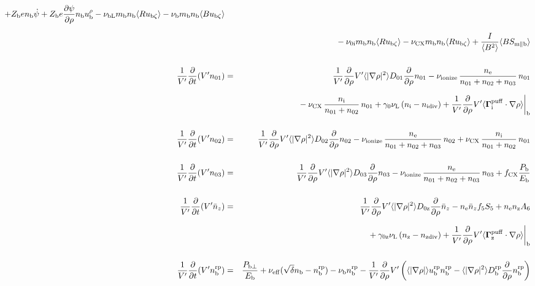 \documentclass[11pt]{article}
\def\bvec#1{\leavevmode\hbox{\boldmath$#1$}}
\let\vec=\bvec
\def\r#1{{\rm#1}}
\def\aves#1{\langle#1\rangle}
\def\dd#1#2{\frac{\partial #1}{\partial #2}}
\def\para{\parallel}
\def\ddrho{\frac{\partial}{\partial\rho}}
\def\ddV{\frac{\partial}{\partial V}}
\def\ddt{\frac{\partial}{\partial t}}
\def\mi{m_\r{i}}
\def\mb{m_\r{b}}
\def\nee{n_\r{e}}
\def\ni{n_\r{i}}
\def\nz{n_\r{z}}
\def\nb{n_\r{b}}
\def\Te{T_\r{e}}
\def\Zi{Z_\r{i}}
\def\Zb{Z_\r{b}}
\def\uzt#1{u_{\r{#1}\zeta}}
\def\upara#1{u_{\r{#1}\para}}
\def\qhatpara#1{\hat{q}_{\r{#1}\para}}
\def\urho#1{u_\r{#1}^\rho}
\def\De{D_\r{e}}
\def\nun#1{\nu_\r{0#1}}
\def\ndiv#1{n_\r{#1div}}
\def\nbrp{n_\r{b}^\r{rp}}
\def\ubrp{u_\r{b}^\r{rp}}
\def\Dbrp{D_\r{b}^\r{rp}}
\def\bri{\aves{B^2}\aves{R^2} - I^2}
\def\Pbperp{P_{\r{b}\perp}}
\def\Pb{P_\r{b}}
\def\Eb{E_\r{b}}
\def\nna{n_{01}}
\def\nnb{n_{02}}
\def\nnc{n_{03}}
\def\nnz{\bar{n}_{z}}
\def\nueff{\nu_\r{eff}}
\def\fCX{f_\r{CX}}
\def\nuL{\nu_\r{L}}
\def\nuCX{\nu_\r{CX}}
\def\nuion{\nu_\r{ionize}}
\def\nub{\nu_\r{b}}
\def\nuOL{\nu_\r{OL}}
\def\nubL{\nu_\r{bL}}
\def\red#1{\textcolor{red}{#1}}
\begin{document}
\begin{eqnarray}
%
  + \Zb e              \nb \dot{\psi}
%
  + \Zb e \dd{\psi}{\rho} \nb \urho{b}
%
%
  - \nubL \mb \nb \aves{R \uzt{b}}
%
  - \nub  \mb \nb \aves{B \uzt{b}}
\nonumber\\[2.5mm]&&{}
%
  - \nun{i} \mb \nb \aves{R \uzt{b}}
%
  - \nuCX \mb \nb \aves{R \uzt{b}}
%
%
  + \frac{I}{\aves{B^2}} \aves{B S_{\r{m}\para\r{b}}}
%
\\[5mm]
  \frac{1}{V'} \ddt (V' \nna) &=& 
%
    \frac{1}{V'} \ddrho V' \aves{|\nabla\rho|^2} D_{01} \ddrho \nna
%
  - \nuion\, \frac{\nee}{\nna + \nnb + \nnc}\, \nna
%
\nonumber\\[2.5mm]&&{}
  - \nuCX\, \frac{\ni}{\nna + \nnb}\, \nna
%
  + \gamma_0 \nuL \, (\ni - \ndiv{i})
%
  + \frac{1}{V'} \ddrho V' \aves{\vec{\Gamma}^\r{puff}_\r{i}\cdot\nabla\rho}\biggr|_\r{b}
\\[5mm]
  \frac{1}{V'} \ddt (V' \nnb) &=& 
%
    \frac{1}{V'} \ddrho V' \aves{|\nabla\rho|^2} D_{02} \ddrho \nnb
%
  - \nuion\, \frac{\nee}{\nna + \nnb + \nnc}\, \nnb
%
  + \nuCX\, \frac{\ni}{\nna + \nnb}\, \nna
%
\\[5mm]
  \frac{1}{V'} \ddt (V' \nnc) &=& 
%
    \frac{1}{V'} \ddrho V' \aves{|\nabla\rho|^2} D_{03} \ddrho \nnc
%
  - \nuion\, \frac{\nee}{\nna + \nnb + \nnc}\, \nnc
%
  + \fCX \frac{\Pb}{\Eb}
\\[5mm]
  \frac{1}{V'} \ddt (V' \nnz) &=& 
%
    \frac{1}{V'} \ddrho V' \aves{|\nabla\rho|^2} D_{0\r{z}} \ddrho \nnz
%
  - \nee \nnz f_5S_5 + \nee \nz A_6 
\nonumber\\[2.5mm]&&{}
%
  + \gamma_\r{0z} \nuL \, (\nz - \ndiv{z})
%
  + \frac{1}{V'} \ddrho V' \aves{\vec{\Gamma}^\r{puff}_\r{z}\cdot\nabla\rho}\biggr|_\r{b}
\\[5mm]
  \frac{1}{V'} \ddt (V' \nbrp) &=&
%
    \frac{\Pbperp}{\Eb}
%
  + \nueff (\sqrt{\delta} \nb - \nbrp)
%
  - \nub \nbrp
%
  - \frac{1}{V'} \ddrho V' \left( \aves{|\nabla\rho|} \ubrp \nbrp - \aves{|\nabla\rho|^2} \Dbrp \ddrho \nbrp \right)
%
\end{eqnarray}
\end{document}
